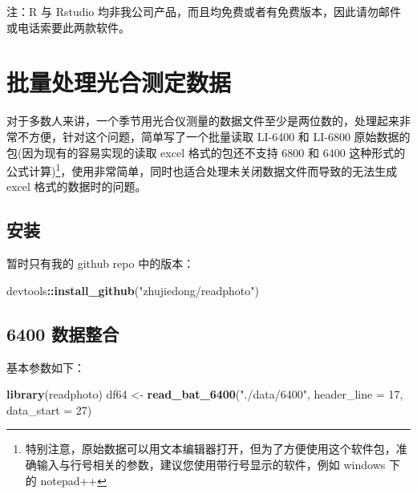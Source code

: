 \documentclass[
]{krantz}
\makeatletter
\newenvironment{Shaded}{\begin{snugshade}}{\end{snugshade}}
\newcommand{\DataTypeTok}[1]{\textcolor[rgb]{0.13,0.29,0.53}{#1}}
\newcommand{\DecValTok}[1]{\textcolor[rgb]{0.00,0.00,0.81}{#1}}
\newcommand{\KeywordTok}[1]{\textcolor[rgb]{0.13,0.29,0.53}{\textbf{#1}}}
\newcommand{\NormalTok}[1]{#1}
\newcommand{\OperatorTok}[1]{\textcolor[rgb]{0.81,0.36,0.00}{\textbf{#1}}}
\newcommand{\StringTok}[1]{\textcolor[rgb]{0.31,0.60,0.02}{#1}}
\renewenvironment{quote}{\begin{VF}}{\end{VF}}
\newenvironment{kframe}{%
\medskip{}
\setlength{\fboxsep}{.8em}
 \def\at@end@of@kframe{}%
 \ifinner\ifhmode%
  \def\at@end@of@kframe{\end{minipage}}%
  \begin{minipage}{\columnwidth}%
 \fi\fi%
 \def\FrameCommand##1{\hskip\@totalleftmargin \hskip-\fboxsep
 \colorbox{shadecolor}{##1}\hskip-\fboxsep
     \hskip-\linewidth \hskip-\@totalleftmargin \hskip\columnwidth}%
 \MakeFramed {\advance\hsize-\width
   \@totalleftmargin\z@ \linewidth\hsize
   \@setminipage}}%
 {\par\unskip\endMakeFramed%
 \at@end@of@kframe}
\renewenvironment{Shaded}{\begin{kframe}}{\end{kframe}}
\makeatother
\begin{document}
\begin{quote}
注：R 与 Rstudio 均非我公司产品，而且均免费或者有免费版本，因此请勿邮件或电话索要此两款软件。
\end{quote}

\cleardoublepage

\hypertarget{batch_question}{%
\chapter{批量处理光合测定数据}\label{batch_question}}

对于多数人来讲，一个季节用光合仪测量的数据文件至少是两位数的，处理起来非常不方便，针对这个问题，简单写了一个批量读取 LI-6400 和 LI-6800 原始数据的包(因为现有的容易实现的读取 excel 格式的包还不支持 6800 和 6400 这种形式的公式计算)\footnote{特别注意，原始数据可以用文本编辑器打开，但为了方便使用这个软件包，准确输入与行号相关的参数，建议您使用带行号显示的软件，例如 windows 下的 notepad++}，使用非常简单，同时也适合处理未关闭数据文件而导致的无法生成 excel 格式的数据时的问题。

\hypertarget{install_readphoto}{%
\section{安装}\label{install_readphoto}}

暂时只有我的 github repo 中的版本：

\begin{Shaded}
\begin{Highlighting}[]
\NormalTok{devtools}\OperatorTok{::}\KeywordTok{install_github}\NormalTok{(}\StringTok{"zhujiedong/readphoto"}\NormalTok{)}
\end{Highlighting}
\end{Shaded}

\hypertarget{batch64}{%
\section{6400 数据整合}\label{batch64}}

基本参数如下：

\begin{Shaded}
\begin{Highlighting}[]
\KeywordTok{library}\NormalTok{(readphoto)}
\NormalTok{df64  <-}\StringTok{ }\KeywordTok{read_bat_6400}\NormalTok{(}\StringTok{"./data/6400"}\NormalTok{, }\DataTypeTok{header_line =} \DecValTok{17}\NormalTok{, }\DataTypeTok{data_start =} \DecValTok{27}\NormalTok{)}
\end{Highlighting}
\end{Shaded}
\end{document}
